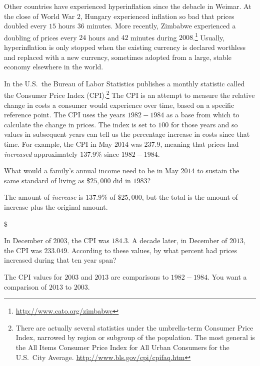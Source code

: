 \documentclass{ximera}
\begin{document}
Other countries have experienced hyperinflation since the debacle in Weimar. At the close of World War $2$, Hungary experienced inflation so bad that prices doubled every $15$ hours $36$ minutes. More recently, Zimbabwe experienced a doubling of prices every $24$ hours and $42$ minutes during $2008$.\footnote{\href{http://www.cato.org/zimbabwe}{http://www.cato.org/zimbabwe}} Usually, hyperinflation is only stopped when the existing currency is declared worthless and replaced with a new currency, sometimes adopted from a large, stable economy elsewhere in the world.

In the U.S.\ the Bureau of Labor Statistics publishes a monthly statistic called the Consumer Price Index (CPI).\footnote{There are actually several statistics under the umbrella-term Consumer Price Index, narrowed by region or subgroup of the population. The most general is the All Items Consumer Price Index for All Urban Consumers for the U.S.\ City Average. \href{http://www.bls.gov/cpi/cpifaq.htm}{http://www.bls.gov/cpi/cpifaq.htm}} The CPI is an attempt to measure the relative change in costs a consumer would experience over time, based on a specific reference point. The CPI uses the years $1982-1984$ as a base from which to calculate the change in prices. The index is set to $100$ for those years and so values in subsequent years can tell us the percentage increase in costs since that time. For example, the CPI in May $2014$ was $237.9$, meaning that prices had \emph{increased} approximately $137.9\%$ since $1982-1984$.

\begin{question}
What would a family's annual income need to be in May $2014$ to sustain the same standard of living as $\$25,000$ did in $1983$?

\begin{hint}
The amount of \emph{increase} is $137.9\%$ of $\$25,000$, but the total is the amount of increase plus the original amount.
\end{hint}
$\$$

\end{question}

\begin{question}
In December of $2003$, the CPI was $184.3$. A decade later, in December of $2013$, the CPI was $233.049$. According to these values, by what percent had prices increased during that ten year span?

\begin{hint}
The CPI values for $2003$ and $2013$ are comparisons to $1982-1984$. You want a comparison of $2013$ to $2003$.
\end{hint}
\begin{multipleChoice}
\end{multipleChoice}

\end{question}
\end{document}
